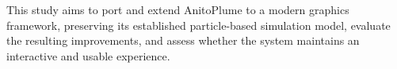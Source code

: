 This study aims to port and extend AnitoPlume to a modern graphics framework, preserving its established particle-based simulation model, evaluate the resulting improvements, and assess whether the system maintains an interactive and usable experience.

%
%

